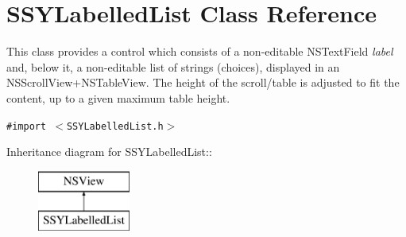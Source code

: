 \hypertarget{interface_s_s_y_labelled_list}{
\section{SSYLabelledList Class Reference}
\label{interface_s_s_y_labelled_list}
}
This class provides a control which consists of a non-editable NSTextField {\em label\/} and, below it, a non-editable list of strings (choices), displayed in an NSScrollView+NSTableView. The height of the scroll/table is adjusted to fit the content, up to a given maximum table height.  


{\tt \#import $<$SSYLabelledList.h$>$}

Inheritance diagram for SSYLabelledList::\begin{figure}[H]
\begin{center}
\leavevmode
\includegraphics[height=2cm]{interface_s_s_y_labelled_list}
\end{center}
\end{figure}
